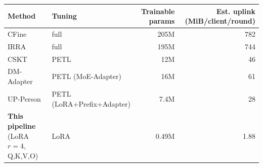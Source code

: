 \begin{tabular}{l l r r}
\toprule
Method & Tuning & Trainable params & Est. uplink (MiB/client/round)\\
\midrule
CFine & full & 205M & 782\\
IRRA & full & 195M & 744\\
CSKT & PETL & 12M & 46\\
DM-Adapter & PETL (MoE-Adapter) & 16M & 61\\
UP-Person & PETL (LoRA+Prefix+Adapter) & 7.4M & 28\\
\textbf{This pipeline} (LoRA $r{=}4$, Q,K,V,O) & LoRA & 0.49M & 1.88\\
\bottomrule
\end{tabular}
